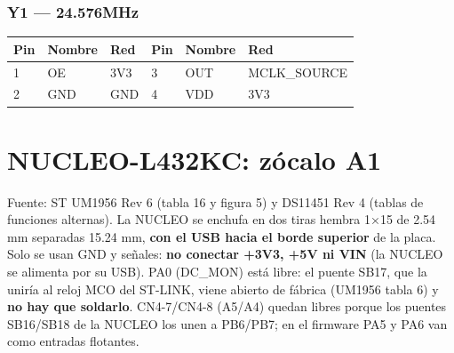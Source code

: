 \documentclass[10pt,a4paper]{article}
\begin{document}
\subsubsection*{Y1 — 24.576MHz}
{\footnotesize\begin{tabular}{@{}lll|lll@{}}\toprule
\textbf{Pin} & \textbf{Nombre} & \textbf{Red} & \textbf{Pin} & \textbf{Nombre} & \textbf{Red}\\\midrule
1 & OE & 3V3 & 3 & OUT & MCLK\_\allowbreak{}SOURCE\\
2 & GND & GND & 4 & VDD & 3V3\\
\bottomrule\end{tabular}}
\section{NUCLEO-L432KC: zócalo A1}\label{sec:nuc}
Fuente: ST UM1956 Rev 6 (tabla 16 y figura 5) y DS11451 Rev 4 (tablas de funciones alternas).
La NUCLEO se enchufa en dos tiras hembra 1×15 de 2.54 mm separadas 15.24 mm, \textbf{con el USB hacia el
borde superior} de la placa. Solo se usan GND y señales: \textbf{no conectar +3V3, +5V ni VIN} (la
NUCLEO se alimenta por su USB). PA0 (DC\_MON) está libre: el puente SB17, que la uniría al reloj MCO del
ST-LINK, viene abierto de fábrica (UM1956 tabla 6) y \textbf{no hay que soldarlo}. CN4-7/CN4-8 (A5/A4) quedan
libres porque los puentes SB16/SB18 de la
NUCLEO los unen a PB6/PB7; en el firmware PA5 y PA6 van como entradas flotantes.
\end{document}
